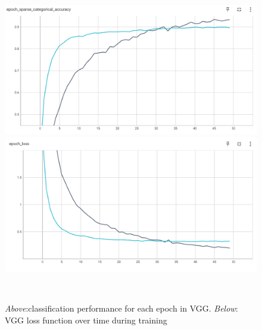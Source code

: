 \begin{figure}
    \centering
    \includegraphics[scale=0.35]{vgg16_epoch_acc.png}
    \includegraphics[scale=0.35]{vgg16_epoch_loss.png}
    \caption{\emph{Above}:classification performance for each epoch in VGG. \emph{Below}: VGG loss function over time during training}\
    \label{fig:vgg_epoch_results}
\end{figure}


   
    


